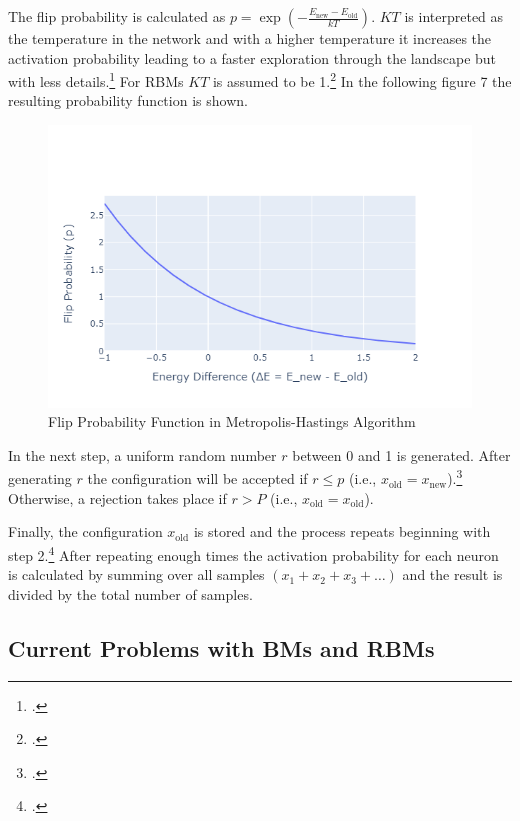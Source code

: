The flip probability is calculated as $p=\exp\left(-\frac{E_{\text{new}}-E_{\text{old}}}{kT}\right)$.
\( KT \) is interpreted as the temperature in the network and with a higher temperature it increases
the activation probability leading to a faster exploration through the landscape but with less details.\footcite[cf.][1-9]{liTemperatureBasedRestricted2016}
For \ac{RBM}s \( KT \) is assumed to be 1.\footcite[cf.][3]{hintonBoltzmannMachines2014} In the following figure 7 the resulting probability function is shown.

\begin{figure}[H]
    \centering
    \includegraphics[width=0.7\linewidth]{graphics/Flip Probability Function in Metropolis-Hastings Algorithm2.png}
    \caption{Flip Probability Function in Metropolis-Hastings Algorithm}
\end{figure}

In the next step, a uniform random number $r$ between 0 and 1 is generated.
After generating $r$ the configuration will be accepted if $r \leq p$ (i.e., $x_{\text{old}}=x_{\text{new}}$).\footcite[cf.][2-3]{patronOptimalRelaxationRate2024}
Otherwise, a rejection takes place if $r > P$ (i.e., $x_{\text{old}}=x_{\text{old}}$).

Finally, the configuration $x_{\text{old}}$ is stored and the process repeats beginning with step 2.\footcite[cf.][17]{patronOptimalRelaxationRate2024}
After repeating enough times the activation probability for each neuron is calculated by summing over all samples $(x_1+x_2+x_3+\ldots)$ and the result is divided by the total number of samples.

\subsection{Current Problems with BMs and RBMs}

